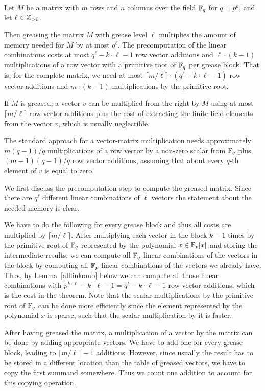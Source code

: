 \begin{Theo}
\label{theogrease}
Let $M$ be a matrix with $m$ rows and $n$ columns over the field\/ $\mathbb{F}_q$
for $q = p^k$, and let $\ell \in \mathbb{Z}_{> 0}$.

Then greasing the matrix $M$ with grease level $\ell$ multiplies the amount
of memory needed for $M$ by at most $q^\ell$. The precomputation of the
linear combinations costs at most 
$q^\ell-k\cdot \ell -1$ row vector additions 
and $\ell \cdot (k-1)$ multiplications of a row vector with a primitive
root of $\mathbb{F}_q$ per grease block. That is, for the complete matrix, we
need at most $\lceil m/\ell \rceil \cdot (q^\ell-k\cdot \ell -1)$ row
vector additions and $m \cdot (k-1)$ multiplications by the primitive
root.

If $M$ is greased, a vector $v$ can be multiplied from the right by $M$
using at most $\lceil m/\ell \rceil$ row vector additions plus the 
cost of extracting the finite field elements from the vector $v$, which
is usually neglectible.

The standard approach for a vector-matrix multiplication needs 
approximately $m(q-1)/q$ multiplications of a row vector by a non-zero
scalar from $\mathbb{F}_q$ plus $(m-1)(q-1)/q$ row vector additions, assuming that 
about every $q$-th element of $v$ is equal to zero.
\end{Theo}
\Proof We first discuss the precomputation step to compute the greased
matrix. Since there are $q^\ell$ different linear combinations of $\ell$ 
vectors the statement about the needed memory is clear.

We have to do the following for every grease block and thus 
all costs are multiplied by $\lceil m/\ell \rceil$. 
After multiplying each vector in the
block $k-1$ times by the primitive root of $\mathbb{F}_q$ represented by the
polynomial $x \in \mathbb{F}_p[x]$ and storing the intermediate results, 
we can compute all $\mathbb{F}_q$-linear combinations
of the vectors in the block by computing all $\mathbb{F}_p$-linear combinations
of the vectors we already have. Thus, by Lemma~\ref{alllinkomb} below we can
compute all those linear combinations with 
$p^{k\cdot \ell} - k\cdot \ell - 1 = 
q^\ell - k \cdot \ell - 1$ row vector additions, which is the cost in the
theorem. Note that the scalar multiplications by the
primitive root of\/ $\mathbb{F}_q$ can be done
more efficiently since the element represented by the polynomial $x$
is sparse, such that the scalar multiplication by it is faster.

After having greased the matrix, a multiplication of a vector by 
the matrix can be done by adding appropriate vectors. We have to add
one for every grease block, leading to $\lceil m/\ell \rceil - 1$ additions.
However, since usually the result has to be stored in a different location
than the table of greased vectors, we have to copy the first summand
somewhere. Thus we count one addition to account for this copying operation.
\ProofEnd

